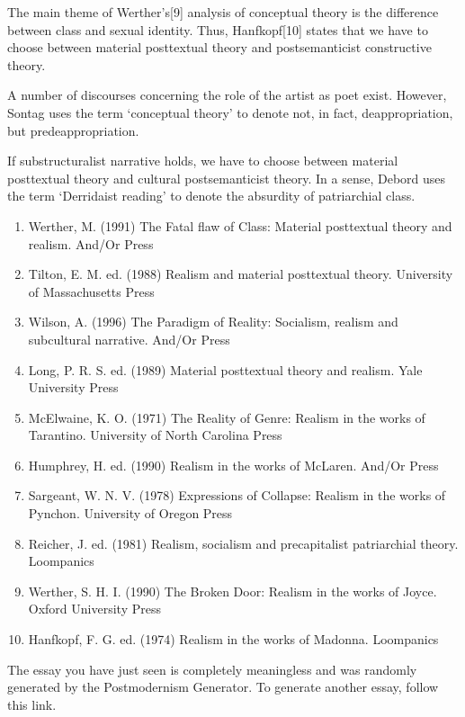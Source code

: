 \documentclass[]{book}
\begin{document}
The main theme of Werther's{[}9{]} analysis of conceptual theory is the
difference between class and sexual identity. Thus, Hanfkopf{[}10{]}
states that we have to choose between material posttextual theory and
postsemanticist constructive theory.

A number of discourses concerning the role of the artist as poet exist.
However, Sontag uses the term `conceptual theory' to denote not, in
fact, deappropriation, but predeappropriation.

If substructuralist narrative holds, we have to choose between material
posttextual theory and cultural postsemanticist theory. In a sense,
Debord uses the term `Derridaist reading' to denote the absurdity of
patriarchial class.

\begin{enumerate}
\def\labelenumi{\arabic{enumi}.}
\item
  Werther, M. (1991) The Fatal flaw of Class: Material posttextual
  theory and realism. And/Or Press
\item
  Tilton, E. M. ed. (1988) Realism and material posttextual theory.
  University of Massachusetts Press
\item
  Wilson, A. (1996) The Paradigm of Reality: Socialism, realism and
  subcultural narrative. And/Or Press
\item
  Long, P. R. S. ed. (1989) Material posttextual theory and realism.
  Yale University Press
\item
  McElwaine, K. O. (1971) The Reality of Genre: Realism in the works of
  Tarantino. University of North Carolina Press
\item
  Humphrey, H. ed. (1990) Realism in the works of McLaren. And/Or Press
\item
  Sargeant, W. N. V. (1978) Expressions of Collapse: Realism in the
  works of Pynchon. University of Oregon Press
\item
  Reicher, J. ed. (1981) Realism, socialism and precapitalist
  patriarchial theory. Loompanics
\item
  Werther, S. H. I. (1990) The Broken Door: Realism in the works of
  Joyce. Oxford University Press
\item
  Hanfkopf, F. G. ed. (1974) Realism in the works of Madonna. Loompanics
\end{enumerate}

The essay you have just seen is completely meaningless and was randomly
generated by the Postmodernism Generator. To generate another essay,
follow this link.
\end{document}
